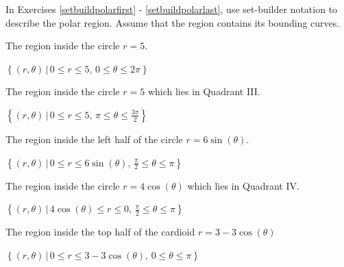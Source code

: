 \documentclass{ximera}
\begin{document}
\begin{question}
In Exercises \ref{setbuildpolarfirst} - \ref{setbuildpolarlast}, use set-builder notation to describe the polar region.  Assume that the region contains its bounding curves.

\begin{problem}\label{setbuildpolarfirst}
The region inside the circle $r = 5$. 

\begin{solution}

$\left\{ (r,\theta) \, | \, 0 \leq r \leq 5, \, 0\leq \theta \leq 2\pi \right\}$

\end{solution}
\end{problem}

\begin{problem}
The region inside the circle $r=5$ which lies in Quadrant III.

\begin{solution}

$\left\{ (r,\theta) \, | \, 0 \leq r \leq 5, \, \pi \leq \theta \leq \frac{3\pi}{2} \right\}$

\end{solution}
\end{problem}

\begin{problem}
The region inside the left half of the circle $r = 6\sin(\theta)$.

\begin{solution}
$\left\{ (r,\theta) \, | \, 0 \leq r \leq 6\sin(\theta), \, \frac{\pi}{2} \leq \theta \leq \pi \right\}$
\end{solution}
\end{problem}

\begin{problem}
The region inside the circle $r = 4\cos(\theta)$ which lies in Quadrant IV.

\begin{solution}
$\left\{ (r,\theta) \, | \, 4\cos(\theta) \leq r \leq 0, \, \frac{\pi}{2} \leq \theta \leq \pi \right\}$
\end{solution}
\end{problem}

\begin{problem}
The region inside the top half of the cardioid $r = 3 - 3\cos(\theta)$

\begin{solution}
$\left\{ (r,\theta) \, | \, 0 \leq r \leq 3 - 3\cos(\theta), \, 0 \leq \theta \leq \pi \right\}$
\end{solution}
\end{problem}


\end{question}
\end{document}
